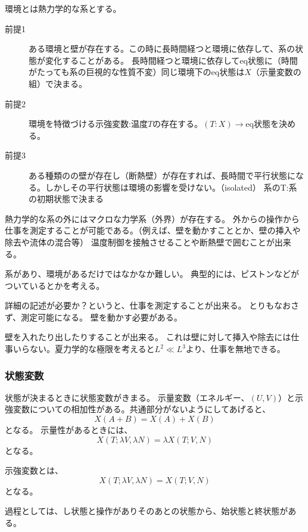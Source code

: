 \documentclass{ltjsarticle}
\begin{document}
環境とは熱力学的な系とする。

\begin{description}
  \item[前提1] ある環境と壁が存在する。この時に長時間経つと環境に依存して、系の状態が変化することがある。
長時間経つと環境に依存してeq状態に（時間がたっても系の巨視的な性質不変）同じ環境下のeq状態は\(X\)（示量変数の組）で決まる。
  \item[前提2] 環境を特徴づける示強変数:温度\(T\)の存在する。\((T:X)\rightarrow \)eq状態を決める。
  \item[前提3] ある種類のの壁が存在し（断熱壁）が存在すれば、長時間で平行状態になる。しかしその平行状態は環境の影響を受けない。（isolated） 系のT:系の初期状態で決まる
\end{description}

熱力学的な系の外にはマクロな力学系（外界）が存在する。
外からの操作から仕事を測定することが可能である。（例えば、壁を動かすこととか、壁の挿入や除去や流体の混合等）
温度制御を接触させることや断熱壁で囲むことが出来る。

系があり、環境があるだけではなかなか難しい。
典型的には、ピストンなどがついているとかを考える。

詳細の記述が必要か？というと、仕事を測定することが出来る。
とりもなおさず、測定可能になる。
壁を動かす必要がある。

壁を入れたり出したりすることが出来る。
これは壁に対して挿入や除去には仕事いらない。夏力学的な極限を考えると\(L^2\ll L^3\)より、仕事を無地できる。




\subsubsection{状態変数}
状態が決まるときに状態変数がきまる。
示量変数（エネルギー、\((U,V)\)）と示強変数についての相加性がある。共通部分がないようにしてあげると、
\begin{equation}
  X(A+B) = X(A)+X(B)
\end{equation}
となる。
示量性があるときには、
\begin{equation}
  X(T;\lambda V, \lambda N) = \lambda X(T;V,N)
\end{equation}
となる。

示強変数とは、
\begin{equation}
  X(T;\lambda V , \lambda N) = X(T;V,N)
\end{equation}
となる。

過程としては、し状態と操作がありそのあとの状態から、始状態と終状態がある。
\end{document}
